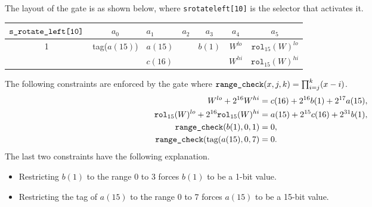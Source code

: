 \documentclass[10pt]{article}
\begin{document}
The layout of the gate is as shown below, where \texttt{s\textunderscore rotate\textunderscore left[10]} is the selector that activates it.

\begin{center}
  \begin{tabular}{c|c|l|l|c|c|c}
    $\texttt{s\textunderscore rotate\textunderscore left[10]}$ & $a_0$ & $a_1$ & $a_2$ & $a_3$ & $a_4$ & $a_5$ \\ \hline
    1  & tag($a(15)$) & $a(15)$ &                        & $b(1)$      & $W^{lo}$  & $\texttt{rol}_{15}(W)^{lo}$  \\ 
       &              & $c(16)$ &                        &             & $W^{hi}$  & $\texttt{rol}_{15}(W)^{hi}$  \\ \hline
  \end{tabular}
\end{center}

The following constraints are enforced by the gate where $\texttt{range\textunderscore check}(x, j, k) = \prod_{i=j}^k (x-i)$.
\begin{align*}
  W^{lo} + 2^{16} W^{hi} & = c(16) + 2^{16} b(1) + 2^{17} a(15),\\
  \texttt{rol}_{15}(W)^{lo} + 2^{16} \texttt{rol}_{15}(W)^{hi} & = a(15) + 2^{15} c(16) + 2^{31} b(1),\\
  \texttt{range\textunderscore check}(b(1), 0, 1) & = 0,\\
  \texttt{range\textunderscore check}(\text{tag}(a(15), 0, 7) & = 0.
\end{align*}
The last two constraints have the following explanation.
\begin{itemize}
\item Restricting $b(1)$ to the range 0 to 3 forces $b(1)$ to be a 1-bit value.
\item Restricting the tag of $a(15)$ to the range 0 to 7 forces $a(15)$ to be a 15-bit value.
\end{itemize}



\newpage


\end{document}
